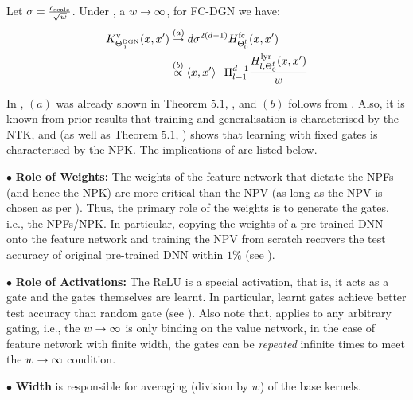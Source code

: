 \begin{theorem}\label{th:main} Let $\sigma=\frac{c_{\text{scale}}}{\sqrt{w}}$. Under , a $w\rightarrow\infty$, for FC-DGN we have: 
\begin{align*}
K^{\text{v}}_{\Theta^{\text{DGN}}_0}(x,x')&\stackrel{(a)}{\rightarrow} d \sigma^{2(d-1)} H^{\text{fc}}_{\Theta^{\textrm{f}}_0}(x,x')\\ 
&\stackrel{(b)}\propto \langle x,x'\rangle\cdot \Pi_{l=1}^{d-1} \frac{H^{\text{lyr}}_{l,\Theta^{\textrm{f}}_0}(x,x')}{w}
\end{align*}
\end{theorem}
In , $(a)$ was already shown in {Theorem $5.1$}, \cite{npk}, and $(b)$ follows from . Also, it is known from prior results \cite{arora2019exact,cao2019generalization} that training and generalisation is characterised by the NTK, and  (as well as {Theorem $5.1$}, \cite{npk}) shows that learning with fixed gates is characterised by the NPK. The implications of  are listed below.

$\bullet$ \textbf{Role of Weights:}  The weights of the feature network that dictate the NPFs (and hence the NPK) are more critical than the NPV (as long as the NPV is chosen as per ). Thus, the primary role of the weights is to generate the gates, i.e., the NPFs/NPK. In particular, copying the weights of a pre-trained DNN onto the feature network and training the NPV from scratch recovers the test accuracy of original pre-trained DNN within $1\%$ (see ). 

$\bullet$ \textbf{Role of Activations:} The ReLU is a special activation, that is, it acts as a gate and the gates themselves are learnt. In particular, learnt gates achieve better test accuracy than random gate (see ). Also note that,  applies to any arbitrary gating, i.e., the $w\rightarrow\infty$ is only binding on the value network, in the case of feature network with finite width, the gates can be \emph{repeated} infinite times to meet the $w\rightarrow\infty$ condition. 

$\bullet$ \textbf{Width} is responsible for averaging (division by $w$) of the base kernels.

